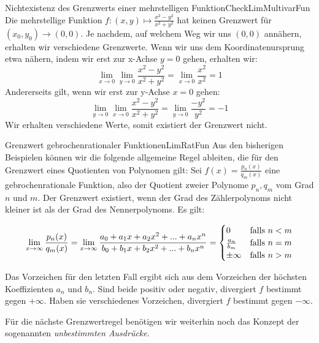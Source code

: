 \begin{example}{Nichtexistenz des Grenzwerts einer mehrstelligen Funktion}{CheckLimMultivarFun}
    Die mehrstellige Funktion $f: (x,y) \mapsto \frac{x^2-y^2}{x^2+y^2}$ hat keinen Grenzwert für $(x_0,y_0) \to (0,0)$. Je nachdem, auf welchem Weg wir uns $(0,0)$ annähern, erhalten wir verschiedene Grenzwerte. Wenn wir uns dem Koordinatenursprung etwa nähern, indem wir erst zur x-Achse $y=0$ gehen, erhalten wir:
    $$
    \lim\limits_{x\to 0} \lim\limits_{y\to 0} \frac{x^2-y^2}{x^2+y^2} = \lim\limits_{x\to 0} \frac{x^2}{x^2} = 1
    $$
    Andererseits gilt, wenn wir erst zur y-Achse $x=0$ gehen:
    $$
    \lim\limits_{y\to 0} \lim\limits_{x\to 0} \frac{x^2-y^2}{x^2+y^2} = \lim\limits_{y\to 0} \frac{-y^2}{y^2} = -1
    $$
    Wir erhalten verschiedene Werte, somit existiert der Grenzwert nicht.
\end{example}

\begin{statement}{Grenzwert gebrochenrationaler Funktionen}{LimRatFun}
    Aus den bisherigen Beispielen können wir die folgende allgemeine Regel ableiten, die für den Grenzwert eines Quotienten von Polynomen gilt:
    Sei $f(x) = \frac{p_n(x)}{q_m(x)}$ eine gebrochenrationale Funktion, also der Quotient zweier Polynome $p_n, q_m$ vom Grad $n$ und $m$. Der Grenzwert existiert, wenn der Grad des Zählerpolynoms nicht kleiner ist als der Grad des Nennerpolynoms. Es gilt:

    \begin{equation}
    \lim\limits_{x\to\infty}\frac{p_n(x)}{q_m(x)} = \lim\limits_{x\to\infty}\frac{a_0 + a_1 x + a_2 x^2 + ... + a_n x^n}{b_0 + b_1 x + b_2 x^2 + ... + b_n x^n} = \begin{cases}
    0 &\text{falls $n < m$} \\
    \frac{a_n}{b_m} &\text{falls $ n = m$} \\
    \pm \infty  &\text{falls $ n > m$}
    \end{cases}
    \end{equation}

    Das Vorzeichen für den letzten Fall ergibt sich aus dem Vorzeichen der höchsten Koeffizienten $a_n$ und $b_n$. Sind beide positiv oder negativ, divergiert $f$ bestimmt gegen $+\infty$. Haben sie verschiedenes Vorzeichen, divergiert $f$ bestimmt gegen $-\infty$.
\end{statement}

Für die nächste Grenzwertregel benötigen wir weiterhin noch das Konzept der sogenannten \emph{unbestimmten Ausdrücke}.

